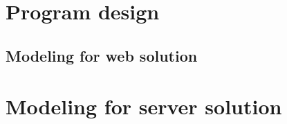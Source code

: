 \chapter{Program design}\label{ch:programDesign}
\section{Modeling for web solution}\label{ch:modelingWebSolution}

\chapter{Modeling for server solution}\label{ch:modelingServerSol}